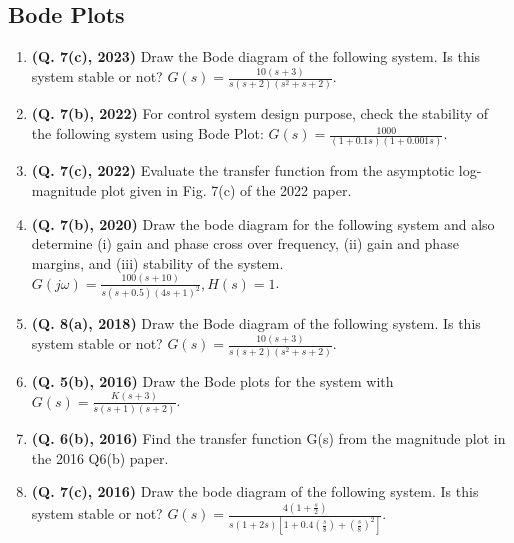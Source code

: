 \documentclass[12pt, a4paper]{article}
\begin{document}
	\subsection{Bode Plots}
	\begin{enumerate}
		\item \textbf{(Q. 7(c), 2023)} Draw the Bode diagram of the following system. Is this system stable or not? $G(s) = \frac{10(s+3)}{s(s+2)(s^2+s+2)}$.
		\item \textbf{(Q. 7(b), 2022)} For control system design purpose, check the stability of the following system using Bode Plot: $G(s) = \frac{1000}{(1+0.1s)(1+0.001s)}$.
		\item \textbf{(Q. 7(c), 2022)} Evaluate the transfer function from the asymptotic log-magnitude plot given in Fig. 7(c) of the 2022 paper.
		\item \textbf{(Q. 7(b), 2020)} Draw the bode diagram for the following system and also determine (i) gain and phase cross over frequency, (ii) gain and phase margins, and (iii) stability of the system. $G(j\omega) = \frac{100(s+10)}{s(s+0.5)(4s+1)^2}, H(s)=1$.
		\item \textbf{(Q. 8(a), 2018)} Draw the Bode diagram of the following system. Is this system stable or not? $G(s) = \frac{10(s+3)}{s(s+2)(s^2+s+2)}$.
		\item \textbf{(Q. 5(b), 2016)} Draw the Bode plots for the system with $G(s) = \frac{K(s+3)}{s(s+1)(s+2)}$.
		\item \textbf{(Q. 6(b), 2016)} Find the transfer function G(s) from the magnitude plot in the 2016 Q6(b) paper.
		\item \textbf{(Q. 7(c), 2016)} Draw the bode diagram of the following system. Is this system stable or not? $G(s) = \frac{4(1+\frac{s}{2})}{s(1+2s)[1+0.4(\frac{s}{8}) + (\frac{s}{8})^2]}$.
	\end{enumerate}
	
\end{document}
